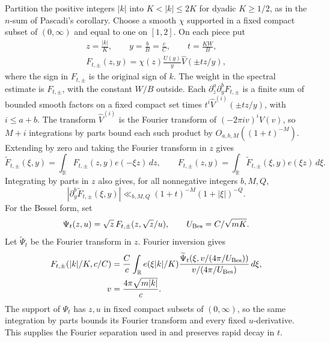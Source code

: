 \documentclass[11pt]{amsart}
\numberwithin{equation}{section}
\theoremstyle{remark}
\begin{document}
Partition the positive integers \(|k|\) into \(K<|k|\le2K\)
for dyadic \(K\ge1/2\), as in the \(n\)-sum of Pascadi's
corollary. Choose a smooth \(\chi\) supported in a fixed compact subset
of \((0,\infty)\) and equal to one on \([1,2]\). On each piece put
\[
 \begin{gathered}
 z=\frac{|k|}{K},\qquad y=\frac{b}{B}=\frac{c}{C},\qquad
 t=\frac{KW}{B},\\
 F_{t,\pm}(z,y)=\chi(z)\frac{U(y)}{y}\widehat V(\pm tz/y),
 \end{gathered}
\]
where the sign in \(F_{t,\pm}\) is the original sign of \(k\).
The weight in the spectral estimate is \(F_{t,\pm}\), with the
constant \(W/B\) outside. Each \(\partial_z^a\partial_y^b F_{t,\pm}\)
is a finite sum of bounded smooth factors on a fixed compact set times
\(t^i\widehat V^{(i)}(\pm tz/y)\), with \(i\le a+b\).
The transform \(\widehat V^{(i)}\) is the Fourier transform of
\((-2\pi i v)^i V(v)\), so \(M+i\) integrations by parts bound
each such product by \(O_{a,b,M}((1+t)^{-M})\).
Extending by zero and taking the Fourier transform in \(z\) gives
\[
 \widetilde F_{t,\pm}(\xi,y)=
    \int_{\mathbb R}F_{t,\pm}(z,y)e(-\xi z)\,dz,\qquad
 F_{t,\pm}(z,y)=\int_{\mathbb R}
    \widetilde F_{t,\pm}(\xi,y)e(\xi z)\,d\xi.
\]
Integrating by parts in \(z\) also gives, for all nonnegative integers
\(b,M,Q\),
\begin{equation}
 |\partial_y^b\widetilde F_{t,\pm}(\xi,y)|
   \ll_{b,M,Q}(1+t)^{-M}(1+|\xi|)^{-Q}.
 \label{eq:spectral-schwartz}
\end{equation}
For the Bessel form, set
\[\Psi_t(z,u)=\sqrt z\,F_{t,\pm}(z,\sqrt z/u),
  \qquad U_{\rm Bes}=C/\sqrt{mK}.\]
Let \(\widetilde\Psi_t\) be the Fourier transform in \(z\).
Fourier inversion gives
\[
 \begin{aligned}
 F_{t,\pm}(|k|/K,c/C)
 &=\frac Cc\int_{\mathbb R} e(\xi |k|/K)
 \frac{\widetilde\Psi_t(\xi,v/(4\pi/U_{\rm Bes}))}
      {v/(4\pi/U_{\rm Bes})}\,d\xi,\\
 v&=\frac{4\pi\sqrt{m|k|}}c .
 \end{aligned}
\]
The support of \(\Psi_t\) has \(z,u\) in fixed compact subsets of
\((0,\infty)\), so the same integration by parts bounds its Fourier
transform and every fixed \(u\)-derivative. This supplies the
Fourier separation used in \cite[(5.21)--(5.26)]{PascadiPi} and
preserves rapid decay in \(t\).
\end{document}
